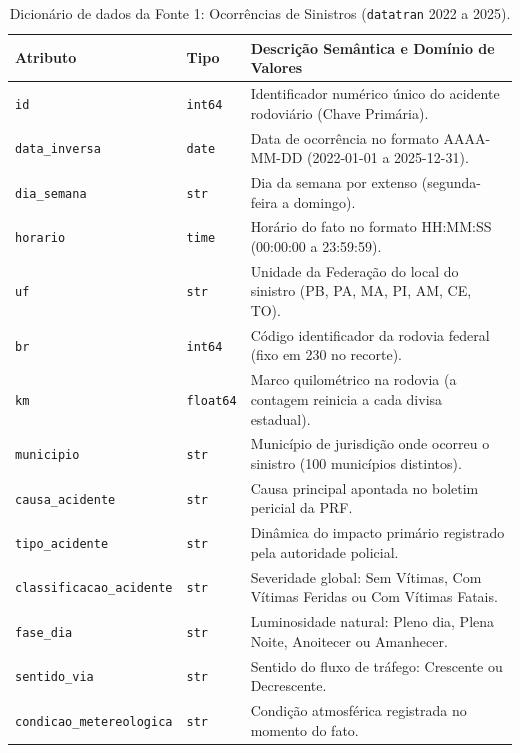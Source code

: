 \documentclass[11pt,a4paper]{article}
\begin{document}
\begin{table}[H]
\centering
\scriptsize
\renewcommand{\arraystretch}{1.15}
\caption{Dicionário de dados da Fonte 1: Ocorrências de Sinistros (\texttt{datatran} 2022 a 2025).}
\label{tab:dicionario_f1}
\begin{tabularx}{\textwidth}{|p{3.2cm}|p{1.4cm}|X|}
\hline
\textbf{Atributo} & \textbf{Tipo} & \textbf{Descrição Semântica e Domínio de Valores} \\
\hline
\texttt{id} & \texttt{int64} & Identificador numérico único do acidente rodoviário (Chave Primária). \\
\hline
\texttt{data\_inversa} & \texttt{date} & Data de ocorrência no formato AAAA-MM-DD (2022-01-01 a 2025-12-31). \\
\hline
\texttt{dia\_semana} & \texttt{str} & Dia da semana por extenso (segunda-feira a domingo). \\
\hline
\texttt{horario} & \texttt{time} & Horário do fato no formato HH:MM:SS (00:00:00 a 23:59:59). \\
\hline
\texttt{uf} & \texttt{str} & Unidade da Federação do local do sinistro (PB, PA, MA, PI, AM, CE, TO). \\
\hline
\texttt{br} & \texttt{int64} & Código identificador da rodovia federal (fixo em 230 no recorte). \\
\hline
\texttt{km} & \texttt{float64} & Marco quilométrico na rodovia (a contagem reinicia a cada divisa estadual). \\
\hline
\texttt{municipio} & \texttt{str} & Município de jurisdição onde ocorreu o sinistro (100 municípios distintos). \\
\hline
\texttt{causa\_acidente} & \texttt{str} & Causa principal apontada no boletim pericial da PRF. \\
\hline
\texttt{tipo\_acidente} & \texttt{str} & Dinâmica do impacto primário registrado pela autoridade policial. \\
\hline
\texttt{classificacao\_acidente} & \texttt{str} & Severidade global: Sem Vítimas, Com Vítimas Feridas ou Com Vítimas Fatais. \\
\hline
\texttt{fase\_dia} & \texttt{str} & Luminosidade natural: Pleno dia, Plena Noite, Anoitecer ou Amanhecer. \\
\hline
\texttt{sentido\_via} & \texttt{str} & Sentido do fluxo de tráfego: Crescente ou Decrescente. \\
\hline
\texttt{condicao\_metereologica}& \texttt{str} & Condição atmosférica registrada no momento do fato. \\

\end{tabularx}
\end{table}
\end{document}
